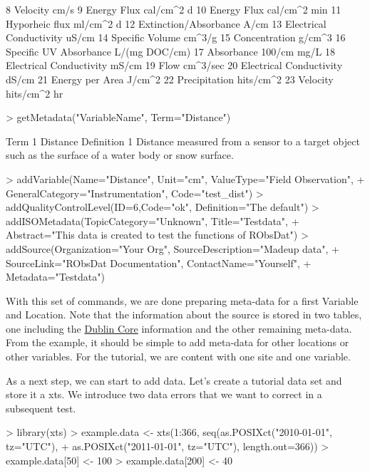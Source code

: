 \documentclass[a4paper]{article}
\begin{document}
\begin{Schunk}
\begin{Soutput}
8                 Velocity          cm/s
9              Energy Flux    cal/cm^2 d
10             Energy Flux  cal/cm^2 min
11          Hyporheic flux     ml/cm^2 d
12   Extinction/Absorbance          A/cm
13 Electrical Conductivity         uS/cm
14         Specific Volume        cm^3/g
15           Concentration        g/cm^3
16  Specific UV Absorbance L/(mg DOC/cm)
17              Absorbance   100/cm mg/L
18 Electrical Conductivity         mS/cm
19                    Flow      cm^3/sec
20 Electrical Conductivity         dS/cm
21         Energy per Area        J/cm^2
22           Precipitation     hits/cm^2
23                Velocity  hits/cm^2 hr
\end{Soutput}
\begin{Sinput}
> getMetadata("VariableName", Term="Distance")
\end{Sinput}
\begin{Soutput}
      Term
1 Distance
                                                                                               Definition
1 Distance measured from a sensor to a target object such as the surface of a water body or snow surface.
\end{Soutput}
\begin{Sinput}
> addVariable(Name="Distance", Unit="cm", ValueType="Field Observation",
+ 	GeneralCategory="Instrumentation", Code="test_dist")
> addQualityControlLevel(ID=6,Code="ok", Definition="The default")
> addISOMetadata(TopicCategory="Unknown", Title="Testdata",
+ 	Abstract="This data is created to test the functions of RObsDat")
> addSource(Organization="Your Org", SourceDescription="Madeup data", 
+ 	SourceLink="RObsDat Documentation", ContactName="Yourself",
+ 	Metadata="Testdata")
\end{Sinput}
\end{Schunk}

With this set of commands, we are done preparing
meta-data for a first Variable and Location. Note
that the information about the source is stored in
two tables, one including the 
\href{http://en.wikipedia.org/wiki/Dublin_Core}{Dublin Core}
information and the other remaining meta-data.
From the example, it should be simple to add
meta-data for other locations or other variables.
For the tutorial, we are content with one site and
one variable.

As a next step, we can start to add data. Let's
create a tutorial data set and store it a xts.
We introduce two data errors that we want to
correct in a subsequent test. 

\begin{Schunk}
\begin{Sinput}
> library(xts)
> example.data <- xts(1:366, seq(as.POSIXct("2010-01-01", tz="UTC"), 
+ 		as.POSIXct("2011-01-01", tz="UTC"), length.out=366))
> example.data[50] <- 100
> example.data[200] <- 40
\end{Sinput}
\end{Schunk}
\end{document}

